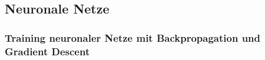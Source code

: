 \subsection{Neuronale Netze}



\subsubsection{Training neuronaler Netze mit Backpropagation und Gradient Descent}